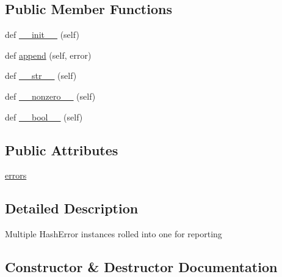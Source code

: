 \subsection*{Public Member Functions}
\begin{DoxyCompactItemize}
\item 
def \hyperlink{classpip_1_1__internal_1_1exceptions_1_1HashErrors_a9836f0d7f0518bdf49f09cdc67eab980}{\+\_\+\+\_\+init\+\_\+\+\_\+} (self)
\item 
def \hyperlink{classpip_1_1__internal_1_1exceptions_1_1HashErrors_a07450b96f1947a970cd20ba62d4cd9a3}{append} (self, error)
\item 
def \hyperlink{classpip_1_1__internal_1_1exceptions_1_1HashErrors_a1f0df3404102191fd54a5a1cee1445f4}{\+\_\+\+\_\+str\+\_\+\+\_\+} (self)
\item 
def \hyperlink{classpip_1_1__internal_1_1exceptions_1_1HashErrors_ae983a04d9eb2d4390a76d07433e4483b}{\+\_\+\+\_\+nonzero\+\_\+\+\_\+} (self)
\item 
def \hyperlink{classpip_1_1__internal_1_1exceptions_1_1HashErrors_ac61f18a120c73c0b19e18a9da62a7200}{\+\_\+\+\_\+bool\+\_\+\+\_\+} (self)
\end{DoxyCompactItemize}
\subsection*{Public Attributes}
\begin{DoxyCompactItemize}
\item 
\hyperlink{classpip_1_1__internal_1_1exceptions_1_1HashErrors_ab591cf6edb36193be1cf199977cab3e2}{errors}
\end{DoxyCompactItemize}


\subsection{Detailed Description}
\begin{DoxyVerb}Multiple HashError instances rolled into one for reporting\end{DoxyVerb}
 

\subsection{Constructor \& Destructor Documentation}
\mbox{\label{classpip_1_1__internal_1_1exceptions_1_1HashErrors_a9836f0d7f0518bdf49f09cdc67eab980}} 
